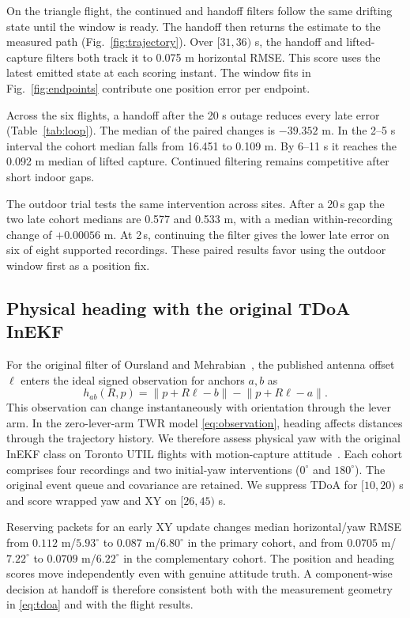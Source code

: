\documentclass{IEEEtaes}
\newcommand{\norm}[1]{\left\lVert#1\right\rVert}
\begin{document}
On the triangle flight, the continued and handoff filters follow the same drifting state until the window is ready. The handoff then returns the estimate to the measured path (Fig.~\ref{fig:trajectory}). Over \([31,36)\) s, the handoff and lifted-capture filters both track it to 0.075 m horizontal RMSE. This score uses the latest emitted state at each scoring instant. The window fits in Fig.~\ref{fig:endpoints} contribute one position error per endpoint.

Across the six flights, a handoff after the 20 s outage reduces every late error (Table~\ref{tab:loop}). The median of the paired changes is \(-39.352\) m. In the 2--5 s interval the cohort median falls from 16.451 to 0.109 m. By 6--11 s it reaches the 0.092 m median of lifted capture. Continued filtering remains competitive after short indoor gaps.

The outdoor trial tests the same intervention across sites. After a 20\,s gap the two late cohort medians are 0.577 and 0.533 m, with a median within-recording change of \(+0.00056\) m. At 2\,s, continuing the filter gives the lower late error on six of eight supported recordings. These paired results favor using the outdoor window first as a position fix.

\subsection{Physical heading with the original TDoA InEKF}
For the original filter of Oursland and Mehrabian~\cite{oursland}, the published antenna offset \(\ell\) enters the ideal signed observation for anchors \(a,b\) as
\begin{equation}
 h_{ab}(R,p)=\norm{p+R\ell-b}-\norm{p+R\ell-a}. \label{eq:tdoa}
\end{equation}
This observation can change instantaneously with orientation through the lever arm. In the zero-lever-arm TWR model \eqref{eq:observation}, heading affects distances through the trajectory history. We therefore assess physical yaw with the original InEKF class on Toronto UTIL flights with motion-capture attitude~\cite{util}. Each cohort comprises four recordings and two initial-yaw interventions (\(0^\circ\) and \(180^\circ\)). The original event queue and covariance are retained. We suppress TDoA for \([10,20)\) s and score wrapped yaw and XY on \([26,45)\) s.

Reserving packets for an early XY update changes median horizontal/yaw RMSE from \(0.112\) m/\(5.93^\circ\) to \(0.087\) m/\(6.80^\circ\) in the primary cohort, and from \(0.0705\) m/\(7.22^\circ\) to \(0.0709\) m/\(6.22^\circ\) in the complementary cohort. The position and heading scores move independently even with genuine attitude truth. A component-wise decision at handoff is therefore consistent both with the measurement geometry in \eqref{eq:tdoa} and with the flight results.
\end{document}
